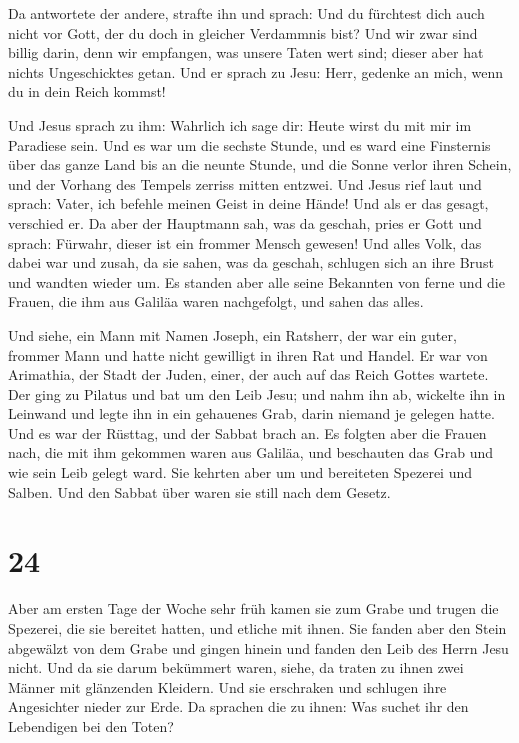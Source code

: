  Da antwortete der andere, strafte ihn und sprach: Und du
fürchtest dich auch nicht vor Gott, der du doch in gleicher Verdammnis
bist?  Und wir zwar sind billig darin, denn wir
empfangen, was unsere Taten wert sind; dieser aber hat nichts
Ungeschicktes getan.  Und er sprach zu Jesu: Herr,
gedenke an mich, wenn du in dein Reich kommst!

 Und Jesus sprach zu ihm: Wahrlich ich sage dir: Heute
wirst du mit mir im Paradiese sein.  Und es war um die
sechste Stunde, und es ward eine Finsternis über das ganze Land bis an
die neunte Stunde,  und die Sonne verlor ihren Schein,
und der Vorhang des Tempels zerriss mitten entzwei.  Und
Jesus rief laut und sprach: Vater, ich befehle meinen Geist in deine
Hände! Und als er das gesagt, verschied er.  Da aber der
Hauptmann sah, was da geschah, pries er Gott und sprach: Fürwahr, dieser
ist ein frommer Mensch gewesen!  Und alles Volk, das
dabei war und zusah, da sie sahen, was da geschah, schlugen sich an ihre
Brust und wandten wieder um.  Es standen aber alle seine
Bekannten von ferne und die Frauen, die ihm aus Galiläa waren
nachgefolgt, und sahen das alles.

 Und siehe, ein Mann mit Namen Joseph, ein Ratsherr, der
war ein guter, frommer Mann  und hatte nicht gewilligt in
ihren Rat und Handel. Er war von Arimathia, der Stadt der Juden, einer,
der auch auf das Reich Gottes wartete.  Der ging zu
Pilatus und bat um den Leib Jesu;  und nahm ihn ab,
wickelte ihn in Leinwand und legte ihn in ein gehauenes Grab, darin
niemand je gelegen hatte.  Und es war der Rüsttag, und
der Sabbat brach an.  Es folgten aber die Frauen nach,
die mit ihm gekommen waren aus Galiläa, und beschauten das Grab und wie
sein Leib gelegt ward.  Sie kehrten aber um und
bereiteten Spezerei und Salben. Und den Sabbat über waren sie still nach
dem Gesetz.

\hypertarget{section-23}{%
\section{24}\label{section-23}}

 Aber am ersten Tage der Woche sehr früh kamen sie zum
Grabe und trugen die Spezerei, die sie bereitet hatten, und etliche mit
ihnen.  Sie fanden aber den Stein abgewälzt von dem Grabe
 und gingen hinein und fanden den Leib des Herrn Jesu
nicht.  Und da sie darum bekümmert waren, siehe, da traten
zu ihnen zwei Männer mit glänzenden Kleidern.  Und sie
erschraken und schlugen ihre Angesichter nieder zur Erde. Da sprachen
die zu ihnen: Was suchet ihr den Lebendigen bei den Toten?

